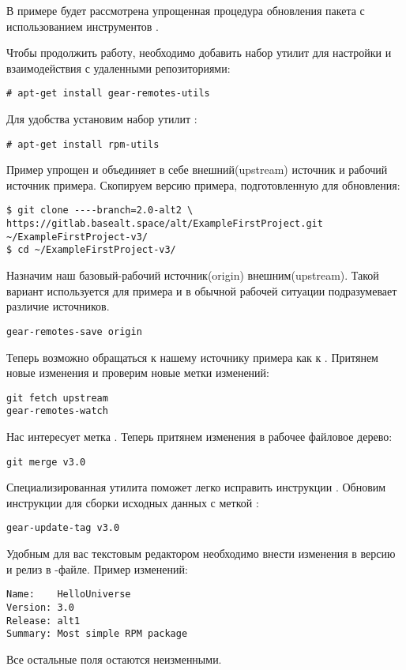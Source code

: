В примере будет рассмотрена упрощенная процедура обновления пакета с
использованием инструментов .

Чтобы продолжить работу, необходимо добавить набор утилит  для
настройки и взаимодействия с удаленными репозиториями:
\begin{verbatim}
# apt-get install gear-remotes-utils
\end{verbatim}

Для удобства установим набор утилит :
\begin{verbatim}
# apt-get install rpm-utils
\end{verbatim}

Пример упрощен и объединяет в себе внешний(upstream) источник и
рабочий источник примера. Скопируем версию примера, подготовленную для
обновления:
\begin{verbatim}
$ git clone ----branch=2.0-alt2 \
https://gitlab.basealt.space/alt/ExampleFirstProject.git ~/ExampleFirstProject-v3/
$ cd ~/ExampleFirstProject-v3/
\end{verbatim}

Назначим наш базовый-рабочий источник(origin) внешним(upstream). Такой вариант
используется для примера и в обычной рабочей ситуации подразумевает различие источников.
\begin{verbatim}
gear-remotes-save origin
\end{verbatim}

Теперь возможно обращаться к нашему источнику примера как к .
Притянем новые изменения и проверим новые метки изменений:
\begin{verbatim}
git fetch upstream
gear-remotes-watch
\end{verbatim}

Нас интересует метка . Теперь притянем изменения в рабочее файловое дерево:
\begin{verbatim}
git merge v3.0
\end{verbatim}

Специализированная утилита поможет легко исправить инструкции
.
Обновим инструкции для сборки исходных данных с меткой :
\begin{verbatim}
gear-update-tag v3.0
\end{verbatim}

Удобным для вас текстовым редактором необходимо внести изменения в версию и релиз
в \Sys{.spec}-файле. Пример изменений:
\begin{verbatim}
Name:    HelloUniverse
Version: 3.0
Release: alt1
Summary: Most simple RPM package
\end{verbatim}
Все остальные поля остаются неизменными.

